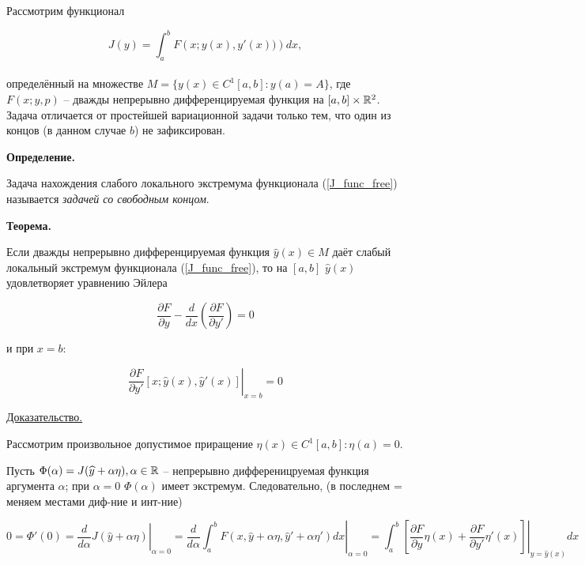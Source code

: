 Рассмотрим функционал 

\begin{equation}\label{J_func_free}
J(y) = \int_a^b F \left( x; y(x), y'(x)) \right) dx,
\end{equation}
\\
определённый на множестве
$M = \{ y(x) \in C^1 [a, b] : y(a) = A\}$, где
$F \left( x; y, p \right)$ -- дважды непрерывно дифференцируемая
функция на $[a, b] \times \mathbb{R}^2$.
Задача отличается от простейшей вариационной задачи только тем,
что один из концов (в данном случае $b$) не зафиксирован.

\textbf{Определение.}

Задача нахождения слабого локального экстремума функционала
(\ref{J_func_free}) называется
\textit{задачей со свободным концом}.

\textbf{Теорема.}

Если дважды непрерывно дифференцируемая функция 
$\widehat{y}(x) \in M$ даёт слабый локальный экстремум функционала
(\ref{J_func_free}), то на $[a, b]$ $\widehat{y}(x)$ удовлетворяет
уравнению Эйлера

\begin{equation}\label{euler_eq_free}
\frac{\partial F}{\partial y} - \frac{d}{dx} \left(
\frac{\partial F}{\partial y'} \right) = 0
\end{equation}

и при $x = b$:

\begin{equation}\label{extra_cond}
\left. 
\frac{\partial F}{\partial y'} 
\left[ x; \widehat{y}(x), \widehat{y}'(x) \right]
\right|_{x = b} = 0
\end{equation}

\underline{Доказательство.}

Рассмотрим произвольное допустимое приращение 
$\eta(x) \in C^1 [a, b] : \eta(a) = 0$.

Пусть $\Phi(\alpha) = J(\widehat{y} + \alpha \eta), \alpha \in \mathbb{R}$ -- 
непрерывно дифференицруемая функция аргумента $\alpha$;
при $\alpha = 0$ $\Phi(\alpha)$ имеет экстремум.
Следовательно, (в последнем = меняем местами диф-ние и инт-ние)

$$
0 = \Phi'(0) = \left. \frac{d}{d\alpha} 
J( \widehat{y} + \alpha \eta) \right|_{\alpha = 0} = 
\left. \frac{d}{d\alpha} \int_a^b F \left( x, \widehat{y} + \alpha \eta, 
\widehat{y}' + \alpha \eta' \right) dx \right|_{\alpha = 0} = 
\left. \int_a^b \left[
\frac{\partial F}{\partial y} \eta(x) + 
\frac{\partial F}{\partial y'} \eta'(x)
\right] \right|_{y = \widehat{y}(x)} dx
$$

